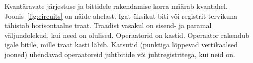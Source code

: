 \documentclass[12pt]{report}
\def\SWAP{\mathop{\mathrm{SWAP}}\nolimits}
\begin{document}
\begin{table}[]
    \caption{Töös kasutatud operaatorid, nende tähtistused, definitsioonid ja tähitused ahelas}
    \label{tab:gates}
\end{table}

Kvantäravate järjestuse ja bittidele rakendamise korra määrab kvantahel.
Joonis~\ref{fig:circuits} on näide ahelast.
Igat üksikut biti või registrit tervikuna tähistab horisontaalne traat.
Traadist vasakul on sisend- ja paramal väljundolekud, kui need on olulised.
Operaatorid on kastid.
Operaator rakendub igale bitile, mille traat kasti läbib.
Katsutid (punktiga lõppevad vertikaalsed jooned) ühendavad operaatoreid juhtbitide või juhtregistritega, kui neid on.
\end{document}
